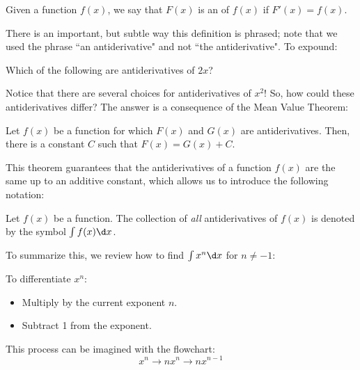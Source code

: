 \documentclass[nooutcomes]{ximera}
\begin{document}
\begin{definition}  
Given a function $f(x)$, we say that $F(x)$ is an  of $f(x)$ if $F'(x) = f(x)$.
\end{definition}

 There is an important, but subtle way this definition is phrased; note that we used the phrase ``an antiderivative" and not ``the antiderivative".  To expound:
 
 \begin{question}
  Which of the following are antiderivatives of $2x$?
  \begin{selectAll}
  \end{selectAll}
\end{question}

Notice that there are several choices for antiderivatives of $x^2$!  So, how could these antiderivatives differ?  The answer is a consequence of the Mean Value Theorem:

\begin{theorem}
Let $f(x)$ be a function for which $F(x)$ and $G(x)$ are antiderivatives.  Then, there is a constant $C$ such that $F(x) = G(x) +C$. 
\end{theorem}

This theorem guarantees that the antiderivatives of a function $f(x)$ are the same up to an additive constant, which allows us to introduce the following notation:


\begin{definition}
Let $f(x)$ be a function.  The collection of \emph{all} antiderivatives of $f(x)$ is denoted by the symbol $\int f(x) \d x$. 
\end{definition}

To summarize this, we review how to find $\int x^n \d x$ for $n \ne -1$:

To differentiate $x^n$:
\begin{itemize}
\item Multiply by the current exponent $n$.
\item Subtract 1 from the exponent.
\end{itemize}
This process can be imagined with the flowchart: $$ x^n \longrightarrow nx^n \longrightarrow nx^{n-1} $$ %
\end{document}
